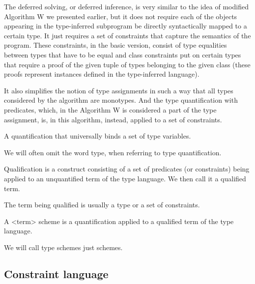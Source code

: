 The deferred solving, or deferred inference, is very similar to the idea of modified Algorithm W we presented earlier, but it does not require each of the objects appearing in the type-inferred subprogram be directly syntactically mapped to a certain type. It just requires a set of constraints that capture the semantics of the program. These constraints, in the basic version, consist of type equalities between types that have to be equal and class constraints put on certain types that require a proof of the given tuple of types belonging to the given class (these proofs represent instances defined in the type-inferred language).

It also simplifies the notion of type assignments in such a way that all types considered by the algorithm are monotypes. And the type quantification with predicates, which, in the Algorithm W is considered a part of the type assignment, is, in this algorithm, instead, applied to a set of constraints.

\begin{defn}
    A quantification that universally binds a set of type variables.

    We will often omit the word type, when referring to type quantification.
\end{defn}

\begin{defn}[Qualification]
    Qualification is a construct consisting of a set of predicates (or constraints) being applied to an unquantified term of the type language. We then call it a qualified term.

    The term being qualified is usually a type or a set of constraints.
\end{defn}

\begin{defn}[Scheme]
    A <term> scheme is a quantification applied to a qualified term of the type language.

    We will call type schemes just schemes.
\end{defn}

\subsection{Constraint language}

